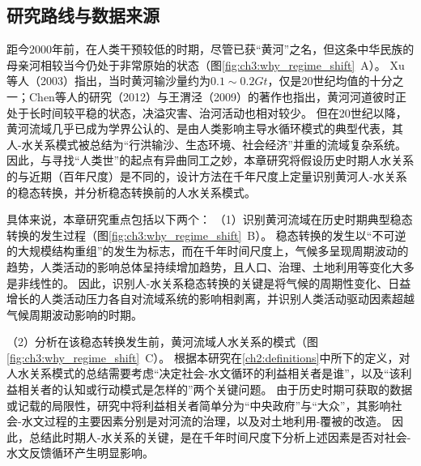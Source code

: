 \subsection{研究路线与数据来源}
\label{sec:ch3:method}


距今$2000$年前，在人类干预较低的时期，尽管已获“黄河”之名，但这条中华民族的母亲河相较当今仍处于非常原始的状态（图\ref{fig:ch3:why_regime_shift}~A）。
Xu等人（2003）\cite{xu2003a}指出，当时黄河输沙量约为$0.1\sim0.2 Gt$，仅是20世纪均值的十分之一；Chen等人的研究（2012）\cite{chen2012}与王渭泾（2009）\cite{WangWeiJing2009}的著作也指出，黄河河道彼时正处于长时间较平稳的状态，决溢灾害、治河活动也相对较少。
但在20世纪以降，黄河流域几乎已成为学界公认的、是由人类影响主导水循环模式的典型代表，其人-水关系模式被总结为“行洪输沙、生态环境、社会经济”并重的流域复杂系统\cite{jiang2020b}。
因此，与寻找“人类世”的起点有异曲同工之妙，本章研究将假设历史时期人水关系的与近期（百年尺度）是不同的，设计方法在千年尺度上定量识别黄河人-水关系的稳态转换，并分析稳态转换前的人水关系模式。

具体来说，本章研究重点包括以下两个：
（1）识别黄河流域在历史时期典型稳态转换的发生过程（图\ref{fig:ch3:why_regime_shift}~B）。
稳态转换的发生以“不可逆的大规模结构重组”的发生为标志，而在千年时间尺度上，气候多呈现周期波动的趋势，人类活动的影响总体呈持续增加趋势，且人口、治理、土地利用等变化大多是非线性的\cite{GeQuanSheng2011}。
因此，识别人-水关系稳态转换的关键是将气候的周期性变化、日益增长的人类活动压力各自对流域系统的影响相剥离，并识别人类活动驱动因素超越气候周期波动影响的时期。

（2）分析在该稳态转换发生前，黄河流域人水关系的模式（图\ref{fig:ch3:why_regime_shift}~C）。
根据本研究在\ref{ch2:definitions}中所下的定义，对人水关系模式的总结需要考虑“决定社会-水文循环的利益相关者是谁”，以及“该利益相关者的认知或行动模式是怎样的”两个关键问题。
由于历史时期可获取的数据或记载的局限性，研究中将利益相关者简单分为“中央政府”与“大众”，其影响社会-水文过程的主要因素分别是对河流的治理，以及对土地利用-覆被的改造。
因此，总结此时期人-水关系的关键，是在千年时间尺度下分析上述因素是否对社会-水文反馈循环产生明显影响。

